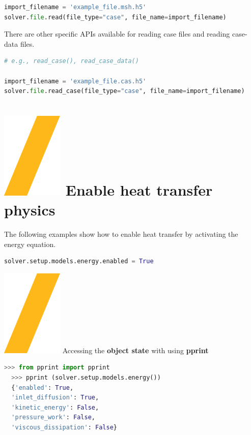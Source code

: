\documentclass[9pt,landscape]{article}
\begin{document}
\begin{multicols}{3}
\begin{lstlisting}[language=Python]
import_filename = 'example_file.msh.h5'
solver.file.read(file_type="case", file_name=import_filename)
\end{lstlisting}

There are other specific APIs available for reading case files and
reading case-data files. 

\begin{lstlisting}[language=Python]
# e.g., read_case(), read_case_data()

import_filename = 'example_file.cas.h5'
solver.file.read_case(file_type="case", file_name=import_filename)  
\end{lstlisting}


\section{\includegraphics[height=\fontcharht\font`\S]{slash.png} Enable heat transfer physics}

The following examples show how to enable heat transfer by activating the energy equation.

\begin{lstlisting}[language=Python]
solver.setup.models.energy.enabled = True
\end{lstlisting}

{\includegraphics[height=\fontcharht\font`\S]{slash.png} Accessing the \textbf{object state} with using \textbf{pprint}

\begin{lstlisting}[language=Python]
  >>> from pprint import pprint
  >>> pprint (solver.setup.models.energy())
  {'enabled': True,
  'inlet_diffusion': True,
  'kinetic_energy': False,
  'pressure_work': False,
  'viscous_dissipation': False}  
\end{lstlisting}


}
\end{multicols}
\end{document}
